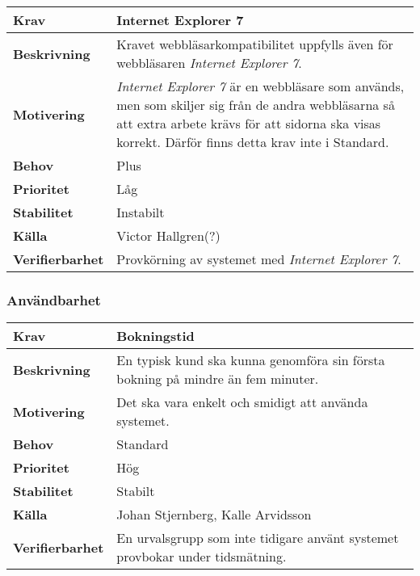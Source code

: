 \documentclass[a4paper, twoside, 11pt, titlepage]{article}
\begin{document}
		\begin{tabular} { p{2.6cm} p{12.5cm} }
			\hline
			\sffamily\textbf{Krav} & Internet Explorer 7  \\
			\hline
			\sffamily\textbf{Beskrivning} & Kravet webbläsarkompatibilitet uppfylls även för webbläsaren \emph{Internet Explorer 7}.  \\
			\hline
			\sffamily\textbf{Motivering} &  \emph{Internet Explorer 7} är en webbläsare som används, men som skiljer sig från de andra webbläsarna så att extra arbete krävs för att sidorna ska visas korrekt. Därför finns detta krav inte i Standard.  \\
			\hline
			\sffamily\textbf{Behov} & Plus  \\
			\hline
			\sffamily\textbf{Prioritet} & Låg  \\
			\hline
			\sffamily\textbf{Stabilitet} & Instabilt  \\
			\hline
			\sffamily\textbf{Källa} & Victor Hallgren(?)  \\
			\hline
			\sffamily\textbf{Verifierbarhet} & Provkörning av systemet med \emph{Internet Explorer 7}.  \\
			\hline
		\end{tabular}


		\subsubsection{Användbarhet}


		\begin{tabular} { p{2.6cm} p{12.5cm} }
			\hline
			\sffamily\textbf{Krav} & Bokningstid  \\
			\hline
			\sffamily\textbf{Beskrivning} & En typisk kund ska kunna genomföra sin första bokning på mindre än fem minuter.  \\
			\hline
			\sffamily\textbf{Motivering} & Det ska vara enkelt och smidigt att använda systemet.  \\
			\hline
			\sffamily\textbf{Behov} & Standard  \\
			\hline
			\sffamily\textbf{Prioritet} & Hög  \\
			\hline
			\sffamily\textbf{Stabilitet} & Stabilt  \\
			\hline
			\sffamily\textbf{Källa} & Johan Stjernberg, Kalle Arvidsson  \\
			\hline
			\sffamily\textbf{Verifierbarhet} & En urvalsgrupp som inte tidigare använt systemet provbokar under tidsmätning.  \\
			\hline
		\end{tabular}
		\vspace{6mm}
\end{document}

